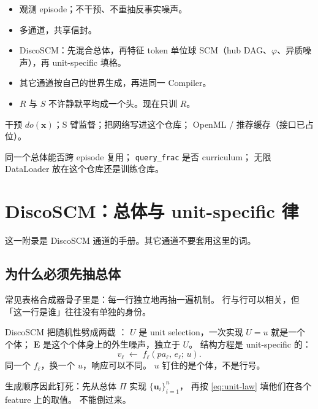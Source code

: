 \documentclass[11pt,a4paper,fontset=none]{ctexart}
\newcommand{\Disco}{\textsf{DiscoSCM}}
\newcommand{\uu}{\mathbf{u}}
\begin{document}
\begin{lockbox}
\begin{itemize}
  \item 观测 episode；不干预、不重抽反事实噪声。
  \item 多通道，共享信封。
  \item DiscoSCM：先混合总体，再特征 token 单位球 SCM（hub DAG、$\varphi$、异质噪声），再 unit-specific 填格。
  \item 其它通道按自己的世界生成，再进同一 Compiler。
  \item $R$ 与 $S$ 不许静默平均成一个头。现在只训 $R$。
\end{itemize}
\end{lockbox}

\begin{laterbox}
干预 $do(\mathbf{x})$；S 臂监督；把网络写进这个仓库；
OpenML / 推荐缓存（接口已占位）。
\end{laterbox}

\begin{openbox}
同一个总体能否跨 episode 复用；
\texttt{query\_frac} 是否 curriculum；
无限 DataLoader 放在这个仓库还是训练仓库。
\end{openbox}

\newpage
\appendix

\section{DiscoSCM：总体与 unit-specific 律}
\label{app:disco}

这一附录是 \Disco{} 通道的手册。其它通道不要套用这里的词。

\subsection{为什么必须先抽总体}

常见表格合成器骨子里是：每一行独立地再抽一遍机制。
行与行可以相关，但「这一行是谁」往往没有单独的身份。

\Disco{} 把随机性劈成两截 \cite{gong2024discoscm}：
$U$ 是 unit selection，一次实现 $U=u$ 就是一个个体；
$\mathbf{E}$ 是这个个体身上的外生噪声，独立于 $U$。
结构方程是 unit-specific 的：
\begin{equation}
  v_{\ell} \;\leftarrow\; f_{\ell}(pa_{\ell},\, e_{\ell};\, u).
  \label{eq:unit-law}
\end{equation}
同一个 $f_{\ell}$，换一个 $u$，响应可以不同。
$u$ 钉住的是个体，不是行号。

生成顺序因此钉死：先从总体 $\Pi$ 实现 $\{\uu_i\}_{i=1}^{n}$，
再按 \eqref{eq:unit-law} 填他们在各个 feature 上的取值。
不能倒过来。
\end{document}
